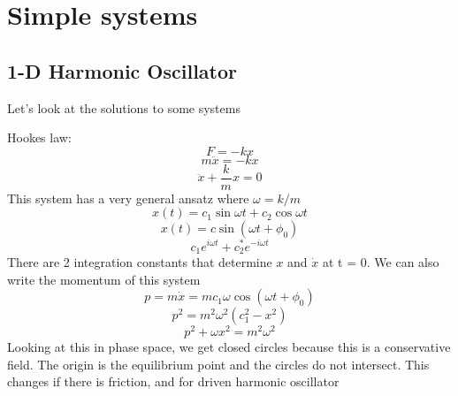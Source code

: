 \documentclass[12pt]{article} %
\begin{document}
\section{Simple systems}
\subsection{1-D Harmonic Oscillator}
Let's look at the solutions to some systems

Hookes law:
\begin{equation}
F = -kx 
\end{equation}
\begin{equation}
m\ddot{x} = -kx
\end{equation}
\begin{equation}
\ddot{x} + \frac{k}{m} x = 0
\end{equation}
This system has a very general ansatz where $\omega = k / m$
\begin{equation}
x(t) = c_1 \sin\omega t + c_2 \cos\omega t
\end{equation}
\begin{equation}
x(t) = c\sin(\omega t + \phi_0)
\end{equation}
\begin{equation}
c_1 e^{i\omega t} + c_2^* e^{-i \omega t}
\end{equation}
There are 2 integration constants that determine $x$ and $\dot{x}$ at t = 0. We can also write the momentum of this system
\begin{equation}
p = m\dot{x} = mc_1 \omega \cos(\omega t + \phi_0)
\end{equation}
\begin{equation}
p^2 = m^2 \omega^2 (c_1^2 - x^2)
\end{equation}
\begin{equation}
p^2 + \omega x^2 = m^2 \omega^2
\end{equation}
Looking at this in phase space, we get closed circles because this is a conservative field. The origin is the equilibrium point and the circles do not intersect. This changes if there is friction, and for driven harmonic oscillator
\end{document}
